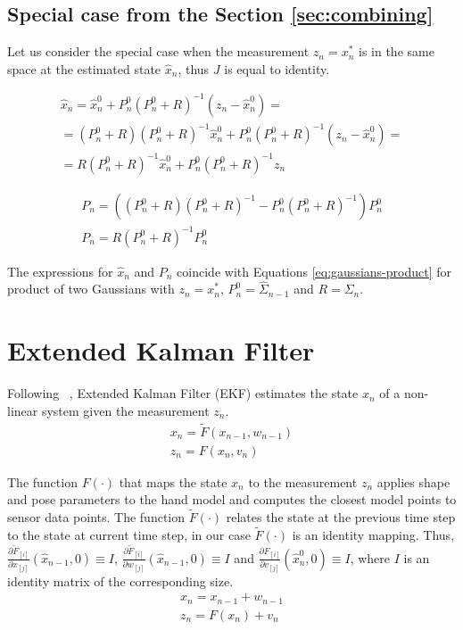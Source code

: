 \documentclass[10pt,twocolumn,letterpaper]{article}
\begin{document}
\subsection{Special case from the Section  \ref{sec:combining}}
Let us consider the special case when the measurement $z_n = x_n^*$ is in the same space at the estimated state $\hat{x}_n$, thus $J$ is equal to identity.

\begin{align*}
\hat{x}_n = \hat{x}_n^0 + P_n^0  (P_n^0 + R)^{-1}(z_n - \hat{x}_n^0) = \\
= (P_n^0 + R)(P_n^0 + R)^{-1}\hat{x}_n^0 + P_n^0  (P_n^0 + R)^{-1}(z_n - \hat{x}_n^0) = \\
= R(P_n^0 + R)^{-1}\hat{x}_n^0 + P_n^0  (P_n^0 + R)^{-1}z_n 
 \end{align*}

\begin{align*}
P_n = ((P_n^0 + R) (P_n^0 + R)^{-1} - P_n^0  (P_n^0 + R)^{-1}) P_n^0\\
P_n = R (P_n^0 + R)^{-1} P_n^0
\end{align*}

The expressions for $\hat{x}_n$ and $P_n$ coincide with Equations \ref{eq:gaussians-product} for product of two Gaussians  with $z_n = x_n^*$, $P_n^0 = \hat{\Sigma}_{n - 1}$ and $R = \Sigma_{n}$.

\section{Extended Kalman Filter}

Following ~\cite{welch1995introduction}, Extended Kalman Filter (EKF) estimates the state $x_n$  of a non-linear system given the measurement $z_n$.
\begin{align}
x_n = \tilde{F}(x_{n - 1},  w_{n - 1}) \\
z_n = F(x_n, v_n)
\end{align}

The function $F(\cdot)$ that maps the state $x_n$ to the measurement $z_n$ applies shape and pose parameters to the hand model and computes the closest model points to sensor data points. 
The function $\tilde{F}(\cdot)$ relates the state at the previous time step to the state at current time step, in our case $\tilde{F}(\cdot)$ is an identity mapping. Thus, $\frac{ \partial \tilde{F}_{[i]}}{ \partial x_{[j]}}(\hat{x}_{n - 1}, 0) \equiv I$, 
$\frac{ \partial \tilde{F}_{[i]}}{ \partial w_{[j]}}(\hat{x}_{n - 1}, 0) \equiv I$ and $\frac{ \partial F_{[i]}}{ \partial v_{[j]}}(\hat{x}_n^0, 0) \equiv I$, where $I$ is an identity matrix of the corresponding size.
\begin{align}
x_n = x_{n - 1} + w_{n - 1} \\
z_n = F(x_n) + v_n 
\end{align}
\end{document}

